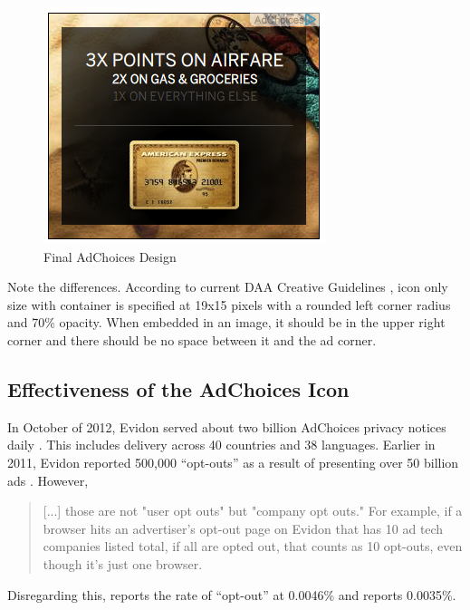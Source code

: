 \begin{figure}
\centerline{
\includegraphics[scale=.5]{chapter6.tex/adchoices_icon_text}
}
\caption{Final AdChoices Design}
\label{final-adchoices}
\end{figure}


Note the differences. According to current DAA Creative Guidelines  \citep{Anonymous:2011ur},  icon only size with container is specified at 19x15 pixels with a rounded left corner radius and 70\% opacity. When embedded in an image, it should be in the upper right corner and there should be no space between it and the ad corner.

\subsection{Effectiveness of the AdChoices Icon}
\label{effectivenessoftheadchoicesicon}

In October of 2012, Evidon served about two billion AdChoices privacy notices daily  \citep{Otlacan:0FDP0X6N}.  This includes delivery across 40 countries and 38 languages. Earlier in 2011, Evidon reported 500,000 ``opt-outs'' as a result of presenting over 50 billion ads  \citep{Dunaway:dVJ7JFhh}.  However,\\

\begin{quote}
[...] those are not "user opt outs" but "company opt outs." For example, if a browser hits an advertiser's opt-out page on Evidon that has 10 ad tech companies listed total, if all are opted out, that counts as 10 opt-outs, even though it's just one browser. \citep{Dunaway:dVJ7JFhh}
\end{quote} 

Disregarding this,  \citet{Dunaway:dVJ7JFhh}  reports the rate of ``opt-out'' at 0.0046\% and  \citet{Logic:2011wn}  reports 0.0035\%.

